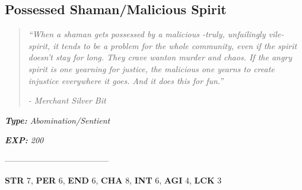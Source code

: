 \documentclass[11pt,a4paper,twocolumn]{book}
\begin{document}
		\subsection*{Possessed Shaman/Malicious Spirit}
	\begin{quote}
		\emph{``When a shaman gets possessed by a malicious -truly, unfailingly vile- spirit, it tends to be a problem for the whole community, even if the spirit doesn't stay for long. They crave wanton murder and chaos. If the angry spirit is one yearning for justice, the malicious one yearns to create injustice everywhere it goes. And it does this for \textit{fun}.''}
		
		\emph{-	Merchant Silver Bit}
	\end{quote}
	
	\noindent
	\emph{\textbf{Type:} Abomination/Sentient}
	
	\noindent
	\emph{\textbf{EXP:} 200}
	
%		
%	
%		

--------------------------------------

\noindent
\textbf{STR} 7, \textbf{PER} 6, \textbf{END} 6, \textbf{CHA} 8, \textbf{INT} 6, \textbf{AGI} 4, \textbf{LCK} 3
\end{document}
